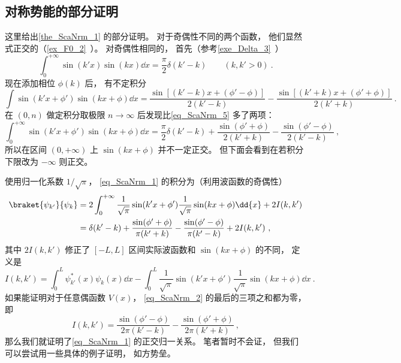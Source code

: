 \subsection{对称势能的部分证明}
这里给出\autoref{the_ScaNrm_1} 的部分证明。 对于奇偶性不同的两个函数， 他们显然式正交的（\autoref{ex_F0_2}~）。 对奇偶性相同的， 首先（参考\autoref{exe_Delta_3}~）
\begin{equation}\label{eq_ScaNrm_5}
\int_{0}^{+\infty} \sin(k'x)\sin(kx)\dd{x} = \frac{\pi}{2}\delta(k'-k)
\qquad (k, k' > 0)~.
\end{equation}
现在添加相位 $\phi(k)$ 后， 有不定积分
\begin{equation}
\int \sin(k'x+\phi')\sin(kx+\phi) \dd{x} = \frac{\sin[(k'-k)x + (\phi'-\phi)]}{2(k'-k)}
- \frac{\sin[(k'+k)x+(\phi'+\phi)]}{2(k'+k)}~.
\end{equation}
在 $(0,n)$ 做定积分取极限 $n\to\infty$ 后发现比\autoref{eq_ScaNrm_5} 多了两项：
\begin{equation}
\int_{0}^{+\infty} \sin(k'x+\phi')\sin(kx+\phi) \dd{x} = \frac{\pi}{2}\delta(k'-k)
+ \frac{\sin(\phi'+\phi)}{2(k'+k)} - \frac{\sin(\phi'-\phi)}{2(k'-k)}~,
\end{equation}
所以在区间 $(0, +\infty)$ 上 $\sin(kx+\phi)$ 并不一定正交。 但下面会看到在若积分下限改为 $-\infty$ 则正交。

使用归一化系数 $1/\sqrt{\pi}$， \autoref{eq_ScaNrm_1} 的积分为（利用波函数的奇偶性）
\begin{equation}\label{eq_ScaNrm_2}
\begin{aligned}
\braket{\psi_{k'}}{\psi_k} &= 2\int_{0}^{+\infty} \frac{1}{\sqrt{\pi}}\sin(k'x+\phi')\frac{1}{\sqrt{\pi}}\sin(kx+\phi) \dd{x} + 2I(k,k')\\
&= \delta(k'-k) + \frac{\sin(\phi'+\phi)}{\pi(k'+k)} - \frac{\sin(\phi'-\phi)}{\pi(k'-k)} + 2I(k,k')~,
\end{aligned}
\end{equation}
其中 $2I(k,k')$ 修正了 $[-L,L]$ 区间实际波函数和 $\sin(kx+\phi)$ 的不同， 定义是
\begin{equation}\label{eq_ScaNrm_8}
I(k,k') = \int_0^L \psi_{k'}^*(x) \psi_k(x) \dd{x}
-\int_{0}^{L} \frac{1}{\sqrt{\pi}}\sin(k'x+\phi') \frac{1}{\sqrt{\pi}}\sin(kx+\phi) \dd{x}~.
\end{equation}
如果能证明对于任意偶函数 $V(x)$， \autoref{eq_ScaNrm_2} 的最后的三项之和都为零， 即
\begin{equation}
I(k,k') = \frac{\sin(\phi'-\phi)}{2\pi(k'-k)} - \frac{\sin(\phi'+\phi)}{2\pi(k'+k)}~,
\end{equation}
那么我们就证明了\autoref{eq_ScaNrm_1} 的正交归一关系。 笔者暂时不会证， 但我们可以尝试用一些具体的例子证明， 如方势垒。

